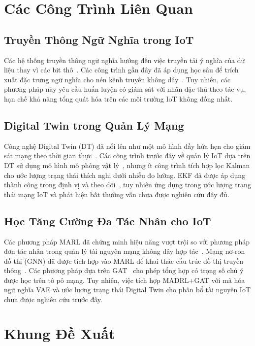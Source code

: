 \documentclass[conference]{IEEEtran}
\begin{document}
\section{Các Công Trình Liên Quan}
\label{sec:related}

\subsection{Truyền Thông Ngữ Nghĩa trong IoT}
Các hệ thống truyền thông ngữ nghĩa hướng đến việc truyền tải
ý nghĩa của dữ liệu thay vì các bit thô~\cite{ref_semantic2}.
Các công trình gần đây đã áp dụng học sâu để trích xuất đặc
trưng ngữ nghĩa cho nén kênh truyền không dây~\cite{ref_deepjscc}.
Tuy nhiên, các phương pháp này yêu cầu huấn luyện có giám sát
với nhãn đặc thù theo tác vụ, hạn chế khả năng tổng quát hóa
trên các môi trường IoT không đồng nhất.

\subsection{Digital Twin trong Quản Lý Mạng}
Công nghệ Digital Twin (DT) đã nổi lên như một mô hình đầy hứa
hẹn cho giám sát mạng theo thời gian thực~\cite{ref_dt_network}.
Các công trình trước đây về quản lý IoT dựa trên DT sử dụng mô
hình mô phỏng vật lý~\cite{ref_dt_iot}, nhưng ít công trình tích
hợp lọc Kalman cho ước lượng trạng thái thích nghi dưới nhiễu
đo lường. EKF đã được áp dụng thành công trong định vị và theo
dõi~\cite{ref_ekf}, tuy nhiên ứng dụng trong ước lượng trạng
thái mạng IoT và phát hiện bất thường vẫn chưa được nghiên cứu
đầy đủ.

\subsection{Học Tăng Cường Đa Tác Nhân cho IoT}
Các phương pháp MARL đã chứng minh hiệu năng vượt trội so với
phương pháp đơn tác nhân trong quản lý tài nguyên mạng không
dây hợp tác~\cite{ref_marl_wireless}. Mạng nơ-ron đồ thị (GNN)
đã được tích hợp vào MARL để khai thác cấu trúc đồ thị truyền
thông~\cite{ref_gnn_marl}. Các phương pháp dựa trên GAT~\cite{ref_gat}
cho phép tổng hợp có trọng số chú ý được học trên tô pô mạng.
Tuy nhiên, việc tích hợp MADRL+GAT với mã hóa ngữ nghĩa VAE và
ước lượng trạng thái Digital Twin cho phân bổ tài nguyên IoT
chưa được nghiên cứu trước đây.

\section{Khung Đề Xuất}
\label{sec:framework}
\end{document}

